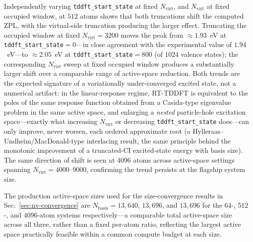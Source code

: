 Independently varying \texttt{tddft\_start\_state} at fixed
$N_{\mathrm{virt}}$, and $N_{\mathrm{virt}}$ at fixed occupied window,
at $512$ atoms shows that both truncations shift the computed ZPL, with
the virtual-side truncation producing the larger effect. Truncating the
occupied window at fixed $N_{\mathrm{virt}}=3200$ moves the peak from
$\approx\!1.93$~eV at \texttt{tddft\_start\_state}$=0$---in close
agreement with the experimental value of $1.94$~eV---to
$\approx\!2.05$~eV at \texttt{tddft\_start\_state}$=800$ (of $1024$
valence states); the corresponding $N_{\mathrm{virt}}$ sweep at fixed
occupied window produces a substantially larger shift over a comparable
range of active-space reduction. Both trends are the expected signature
of a variationally under-converged excited state, not a numerical
artifact: in the linear-response regime, RT-TDDFT is equivalent to the
poles of the same response function obtained from a Casida-type
eigenvalue problem in the same active space, and enlarging a
\emph{nested} particle-hole excitation space---exactly what increasing
$N_{\mathrm{virt}}$ or decreasing \texttt{tddft\_start\_state}
does---can only improve, never worsen, each ordered approximate root (a
Hylleraas--Undheim/MacDonald-type interlacing result, the same
principle behind the monotonic improvement of a truncated-CI
excited-state energy with basis size). The same direction of shift is
seen at $4096$ atoms across active-space settings spanning
$N_{\mathrm{virt}}=4000$--$9000$, confirming the trend persists at the
flagship system size.

The production active-space sizes used for the size-convergence results
in Sec.~\ref{sec:nv-convergence} are $N_{\mathrm{basis}}=13{,}640$,
$13{,}696$, and $13{,}696$ for the $64$-, $512$-, and $4096$-atom
systems respectively---a comparable total active-space size across all
three, rather than a fixed per-atom ratio, reflecting the largest
active space practically feasible within a common compute budget at
each size.

